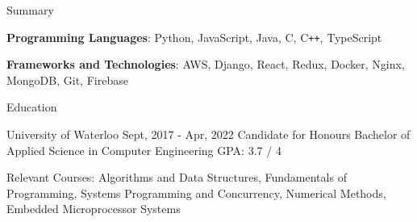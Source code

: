\documentclass{resume} %
\begin{document}
	\begin{rSection}{Summary}
		\begin{rSummarySection} {
			\item \textbf{Programming Languages}:  Python, JavaScript, Java, C, C\texttt{++}, TypeScript
			\item \textbf{Frameworks and Technologies}: AWS, Django, React, Redux, Docker, Nginx, MongoDB, Git, Firebase
		}
		\end{rSummarySection}
	\end{rSection}

	\vspace{-0.5em}
	\begin{rSection}{Education}
		\begin{rUniversitySection}
		{University of Waterloo}
		{Sept, 2017 - Apr, 2022}
		{Candidate for Honours Bachelor of Applied Science in Computer Engineering}
		{GPA: 3.7 / 4}
		{\item Relevant Courses: Algorithms and Data Structures, Fundamentals of Programming, Systems Programming and Concurrency, Numerical Methods, Embedded Microprocessor Systems}
		\end{rUniversitySection}
	\end{rSection}
\end{document}
